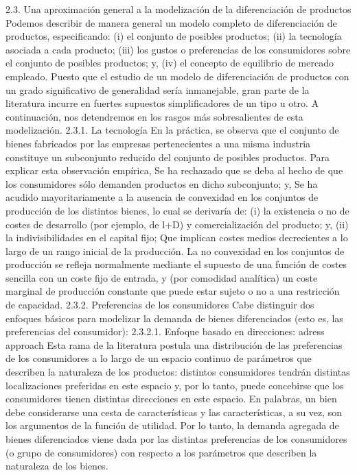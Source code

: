 \documentclass[10pt,a4paper]{article}
\begin{document}
2.3. Una aproximación general a la modelización de la diferenciación de productos
Podemos describir de manera general un modelo completo de diferenciación de productos, especificando: (i) el conjunto de posibles productos; (ii) la tecnología asociada a cada producto; (iii) los gustos o preferencias de los consumidores sobre el conjunto de posibles productos; y, (iv) el concepto de equilibrio de mercado empleado. 
Puesto que el estudio de un modelo de diferenciación de productos con un grado significativo de generalidad sería inmanejable, gran parte de la literatura incurre en fuertes supuestos simplificadores de un tipo u otro. A continuación, nos detendremos en los rasgos más sobresalientes de esta modelización.
2.3.1. La tecnología
En la práctica, se observa que el conjunto de bienes fabricados por las empresas pertenecientes a una misma industria constituye un subconjunto reducido del conjunto de posibles productos. Para explicar esta observación empírica, 
	Se ha rechazado que se deba al hecho de que los consumidores sólo demanden productos en dicho subconjunto;  y,
	Se ha acudido mayoritariamente a la ausencia de convexidad en los conjuntos de producción de los distintos bienes, lo cual se derivaría de: 
(i) la existencia o no de costes de desarrollo (por ejemplo, de l+D) y comercialización del producto; y, (ii) la  indivisibilidades en el capital fijo; 
Que implican costes medios decrecientes a lo largo de un rango inicial de la producción. 
La no convexidad en los conjuntos de producción se refleja normalmente mediante el supuesto de una función de costes sencilla con un coste fijo de entrada, y (por comodidad analítica) un coste marginal de producción constante que puede estar sujeto o no a una restricción de capacidad. 
2.3.2. Preferencias de los consumidores
Cabe distinguir dos enfoques básicos para modelizar la demanda de bienes diferenciados (esto es, las preferencias del consumidor):
2.3.2.1. Enfoque basado en direcciones: adress approach
Esta rama de la literatura postula una distribución de las preferencias de los consumidores a lo largo de un espacio continuo de parámetros que describen la naturaleza de los productos: distintos consumidores tendrán distintas localizaciones preferidas en este espacio y, por lo tanto, puede concebirse que los consumidores tienen distintas direcciones en este espacio.  En palabras, un bien debe considerarse una cesta de características y las características, a su vez, son los argumentos de la función de utilidad.  
Por lo tanto, la demanda agregada de bienes diferenciados viene dada por las distintas preferencias de los consumidores (o grupo de consumidores) con respecto a los parámetros que describen la naturaleza de los bienes.
\end{document}
